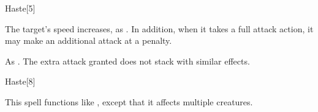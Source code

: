 \begin{spellsection}{Haste}[5]
    \begin{spellheader}
    \end{spellheader}
    \begin{spellcontent}
        \begin{spelltargetinginfo}
        \end{spelltargetinginfo}
        \begin{spelleffects}
            \spelleffect The target's speed increases, as . In addition, when it takes a full attack action, it may make an additional attack at a  penalty.
            \spelldur \durshort
        \end{spelleffects}
    \end{spellcontent}
    \begin{spellfooter}
        \spellnotes As . The extra attack granted does not stack with similar effects.
        \miscastrandom
    \end{spellfooter}
\end{spellsection}

\begin{spellsection}[Mass]{Haste}[8]
    \begin{spellheader}
    \end{spellheader}
    \begin{spellcontent}
        \begin{spelltargetinginfo}
        \end{spelltargetinginfo}
        \begin{spelleffects}
            \spellspecial This spell functions like , except that it affects multiple creatures.
        \end{spelleffects}
    \end{spellcontent}
    \begin{spellfooter}
        \miscastexplode
    \end{spellfooter}
\end{spellsection}

